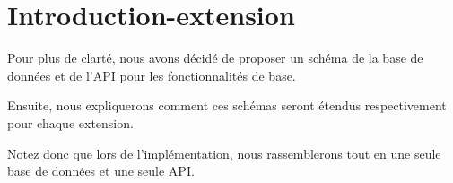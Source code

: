 \section{Introduction-extension}

\begin{flushleft}
Pour plus de clarté, nous avons décidé de proposer un schéma de la base de données et de l'API pour les fonctionnalités de base.
\end{flushleft}

\begin{flushleft}
Ensuite, nous expliquerons comment ces schémas seront étendus respectivement pour chaque extension. 
\end{flushleft}

\begin{flushleft}
Notez donc que lors de l'implémentation, nous rassemblerons tout en une seule base de données et une seule API. 
\end{flushleft}